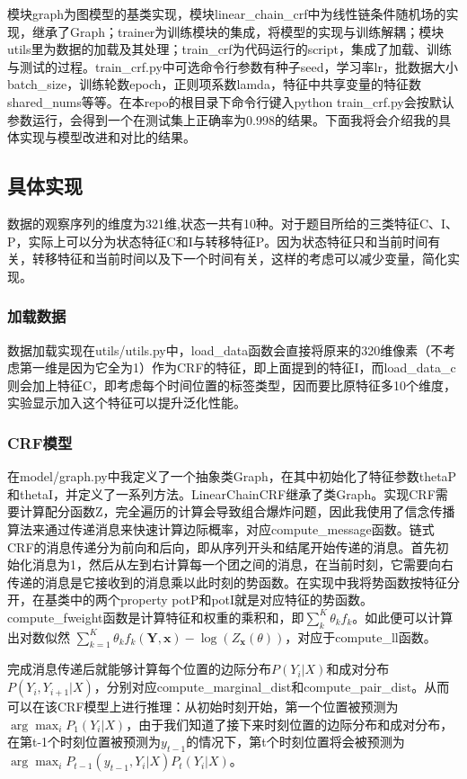 \documentclass[a4paper,UTF8]{article}
\numberwithin{equation}{section}
\begin{document}
模块graph为图模型的基类实现，模块linear\_chain\_crf中为线性链条件随机场的实现，继承了Graph；trainer为训练模块的集成，将模型的实现与训练解耦；模块utils里为数据的加载及其处理；train\_crf为代码运行的script，集成了加载、训练与测试的过程。train\_crf.py中可选命令行参数有种子seed，学习率lr，批数据大小batch\_size，训练轮数epoch，正则项系数lamda，特征中共享变量的特征数shared\_nums等等。在本repo的根目录下命令行键入python train\_crf.py会按默认参数运行，会得到一个在测试集上正确率为0.998的结果。下面我将会介绍我的具体实现与模型改进和对比的结果。
\subsection{具体实现}
数据的观察序列的维度为321维,状态一共有10种。对于题目所给的三类特征C、I、P，实际上可以分为状态特征C和I与转移特征P。因为状态特征只和当前时间有关，转移特征和当前时间以及下一个时间有关，这样的考虑可以减少变量，简化实现。
\subsubsection{加载数据}
数据加载实现在utils/utils.py中，load\_data函数会直接将原来的320维像素（不考虑第一维是因为它全为1）作为CRF的特征，即上面提到的特征I，而load\_data\_c则会加上特征C，即考虑每个时间位置的标签类型，因而要比原特征多10个维度，实验显示加入这个特征可以提升泛化性能。
\subsubsection{CRF模型}
在model/graph.py中我定义了一个抽象类Graph，在其中初始化了特征参数thetaP和thetaI，并定义了一系列方法。LinearChainCRF继承了类Graph。实现CRF需要计算配分函数Z，完全遍历的计算会导致组合爆炸问题，因此我使用了信念传播算法来通过传递消息来快速计算边际概率，对应compute\_message函数。链式CRF的消息传递分为前向和后向，即从序列开头和结尾开始传递的消息。首先初始化消息为1，然后从左到右计算每一个团之间的消息，在当前时刻，它需要向右传递的消息是它接收到的消息乘以此时刻的势函数。在实现中我将势函数按特征分开，在基类中的两个property potP和potI就是对应特征的势函数。
compute\_fweight函数是计算特征和权重的乘积和，即$\sum_k^K \theta_k f_k$。如此便可以计算出对数似然
$\sum_{k=1}^{K} \theta_{k} f_{k}(\mathbf{Y}, \mathbf{x}) -\log \left(Z_{\mathbf{x}}(\theta)\right)$，对应于compute\_ll函数。

完成消息传递后就能够计算每个位置的边际分布$P(Y_i|X)$和成对分布$P(Y_i,Y_{i+1}|X)$，分别对应compute\_marginal\_dist和compute\_pair\_dist。从而可以在该CRF模型上进行推理：从初始时刻开始，第一个位置被预测为$\arg\max _i P_1(Y_i|X)$，由于我们知道了接下来时刻位置的边际分布和成对分布，在第t-1个时刻位置被预测为$y_{t-1}$的情况下，第t个时刻位置将会被预测为$\arg\max_i P_{t-1}(y_{t-1},Y_i|X)P_t(Y_i|X)$。
\end{document}
